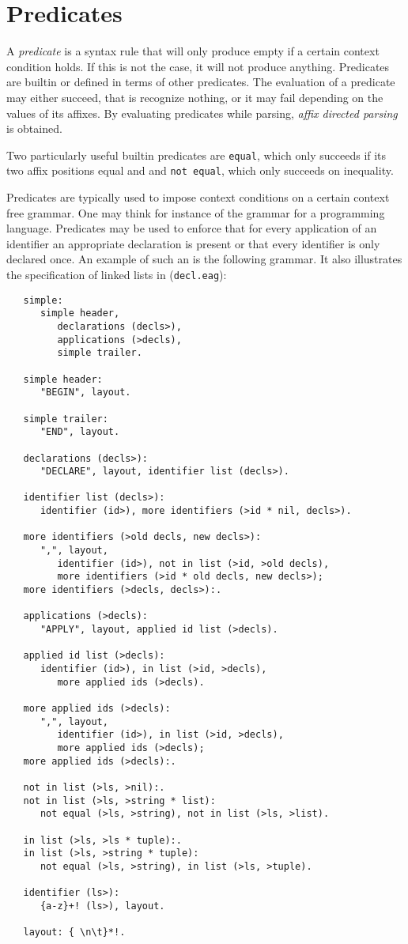 \section {Predicates}
A {\em predicate} is a syntax rule that will only produce empty
if a certain context condition holds. If this is not the case, it
will not produce anything. Predicates are builtin or defined
in terms of other predicates. The evaluation of a predicate
may either succeed, that is recognize nothing, or it may fail
depending on the values of its affixes. By evaluating predicates
while parsing, {\em affix directed parsing} is obtained.

Two particularly useful builtin predicates are {\tt equal},
which only succeeds if its two affix positions equal and and
{\tt not equal}, which only succeeds on inequality.

Predicates are typically used to impose context conditions
on a certain context free grammar. One may think for instance
of the grammar for a programming language. Predicates may be
used to enforce that for every application of an identifier
an appropriate declaration is present or that every identifier
is only declared once. An example of such an \EAG
is the following grammar. It also illustrates the specification
of linked lists in \EAG ({\tt decl.eag}):
\begin{verbatim}
   simple:
      simple header,
         declarations (decls>),
         applications (>decls),
         simple trailer.

   simple header:
      "BEGIN", layout.

   simple trailer:
      "END", layout.

   declarations (decls>):
      "DECLARE", layout, identifier list (decls>).

   identifier list (decls>):
      identifier (id>), more identifiers (>id * nil, decls>).

   more identifiers (>old decls, new decls>):
      ",", layout,
         identifier (id>), not in list (>id, >old decls),
         more identifiers (>id * old decls, new decls>);
   more identifiers (>decls, decls>):.

   applications (>decls):
      "APPLY", layout, applied id list (>decls).

   applied id list (>decls):
      identifier (id>), in list (>id, >decls),
         more applied ids (>decls).

   more applied ids (>decls):
      ",", layout,
         identifier (id>), in list (>id, >decls),
         more applied ids (>decls);
   more applied ids (>decls):.

   not in list (>ls, >nil):.
   not in list (>ls, >string * list):
      not equal (>ls, >string), not in list (>ls, >list).

   in list (>ls, >ls * tuple):.
   in list (>ls, >string * tuple):
      not equal (>ls, >string), in list (>ls, >tuple).

   identifier (ls>):
      {a-z}+! (ls>), layout.

   layout: { \n\t}*!.
\end{verbatim}
